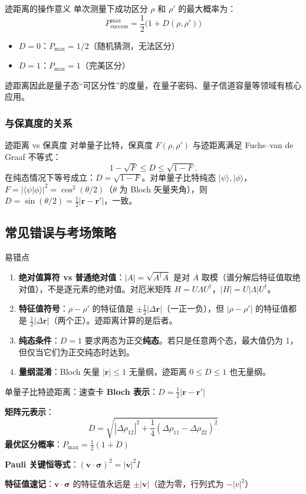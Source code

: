 \begin{insightbox}{迹距离的操作意义}
单次测量下成功区分 $\rho$ 和 $\rho'$ 的最大概率为：
\[
  \boxed{P_{\text{success}}^{\max} = \frac12\bigl(1 + D(\rho,\rho')\bigr)}
\]
\begin{itemize}[nosep]
  \item $D=0$：$P_{\max}=1/2$（随机猜测，无法区分）
  \item $D=1$：$P_{\max}=1$（完美区分）
\end{itemize}
迹距离因此是量子态``可区分性''的度量，在量子密码、量子信道容量等领域有核心应用。
\end{insightbox}

\subsubsection{与保真度的关系}

\begin{tipbox}{迹距离 vs 保真度}
对单量子比特，保真度 $F(\rho,\rho')$ 与迹距离满足 Fuchs--van de Graaf 不等式：
\[
  1 - \sqrt{F} \le D \le \sqrt{1 - F}.
\]
在纯态情况下等号成立：$D = \sqrt{1-F}$。对单量子比特纯态 $|\psi\rangle,|\phi\rangle$，$F=|\langle\psi|\phi\rangle|^2=\cos^2(\theta/2)$（$\theta$ 为 Bloch 矢量夹角），则 $D=\sin(\theta/2)=\frac12|\bm r-\bm r'|$，一致。
\end{tipbox}


\subsection{常见错误与考场策略}

\begin{errorbox}{易错点}
\begin{enumerate}
  \item \textbf{绝对值算符 vs 普通绝对值}：$|A|=\sqrt{A^\dagger A}$ 是对 $A$ 取模（谱分解后特征值取绝对值），不是逐元素的绝对值。对厄米矩阵 $H=U\Lambda U^\dagger$，$|H|=U|\Lambda|U^\dagger$。
  \item \textbf{特征值符号}：$\rho-\rho'$ 的特征值是 $\pm\frac12|\Delta\bm r|$（一正一负），但 $|\rho-\rho'|$ 的特征值都是 $\frac12|\Delta\bm r|$（两个正）。迹距离计算的是后者。
  \item \textbf{纯态条件}：$D=1$ 要求两态为正交\textbf{纯态}。若只是任意两个态，最大值仍为 1，但仅当它们为正交纯态时达到。
  \item \textbf{量纲混淆}：Bloch 矢量 $|\bm r|\le 1$ 无量纲，迹距离 $0\le D\le 1$ 也无量纲。
\end{enumerate}
\end{errorbox}

\begin{cheatbox}{单量子比特迹距离：速查卡}
\textbf{Bloch 表示}：$D = \frac12|\bm r - \bm r'|$

\textbf{矩阵元表示}：
\[
  D = \sqrt{|\Delta\rho_{12}|^2 + \frac14(\Delta\rho_{11}-\Delta\rho_{22})^2}
\]
\textbf{最优区分概率}：$P_{\max} = \frac12(1+D)$

\textbf{Pauli 关键恒等式}：$(\bm v\cdot\bm\sigma)^2 = |\bm v|^2 I$

\textbf{特征值速记}：$\bm v\cdot\bm\sigma$ 的特征值永远是 $\pm|\bm v|$（迹为零，行列式为 $-|v|^2$）
\end{cheatbox}
